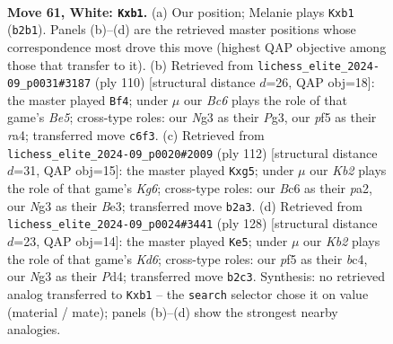 \documentclass[11pt]{article}
\begin{document}
\clearpage

\begin{figure}[p]\centering
\begin{subfigure}{0.46\textwidth}\centering
\resizebox{\linewidth}{!}{%
\newchessgame
\chessboard[
  setfen={8/k7/2B1r3/2R2p2/1P6/6N1/1K4P1/1b6 w - - 0 61},
  showmover=false,
  pgfstyle=straightmove, color=movearrow, markmove={b2-b1}
]}
\caption{}
\end{subfigure}\hfill
\begin{subfigure}{0.46\textwidth}\centering
\resizebox{\linewidth}{!}{%
\newchessgame
\chessboard[
  setfen={8/8/4k3/4B1Rp/r1P3b1/3K2P1/8/8 w - - 1 56},
  showmover=false,
  pgfstyle=straightmove, color=movearrow, markmove={e5-f4}
]}
\caption{}
\end{subfigure}
\\[4pt]
\begin{subfigure}{0.46\textwidth}\centering
\resizebox{\linewidth}{!}{%
\newchessgame
\chessboard[
  setfen={8/1k6/6K1/6p1/6P1/R3B3/pr3P2/8 w - - 11 57},
  showmover=false,
  pgfstyle=straightmove, color=movearrow, markmove={g6-g5}
]}
\caption{}
\end{subfigure}\hfill
\begin{subfigure}{0.46\textwidth}\centering
\resizebox{\linewidth}{!}{%
\newchessgame
\chessboard[
  setfen={8/8/3KR3/3p2B1/2bP1P2/5k2/8/6r1 w - - 3 65},
  showmover=false,
  pgfstyle=straightmove, color=movearrow, markmove={d6-e5}
]}
\caption{}
\end{subfigure}
\caption{\textbf{Move 61, White: \texttt{Kxb1}.} (a) Our position; Melanie plays \texttt{Kxb1} (\texttt{b2b1}). Panels (b)--(d) are the retrieved master positions whose correspondence most drove this move (highest QAP objective among those that transfer to it). (b) Retrieved from \texttt{lichess\_elite\_2024-09\_p0031\#3187} (ply 110) [structural distance $d$=26, QAP obj=18]: the master played \texttt{Bf4}; under $\mu$ our \emph{Bc6} plays the role of that game's \emph{Be5}; cross-type roles: our \emph{N}g3 as their \emph{P}g3, our \emph{p}f5 as their \emph{r}a4; transferred move \texttt{c6f3}. (c) Retrieved from \texttt{lichess\_elite\_2024-09\_p0020\#2009} (ply 112) [structural distance $d$=31, QAP obj=15]: the master played \texttt{Kxg5}; under $\mu$ our \emph{Kb2} plays the role of that game's \emph{Kg6}; cross-type roles: our \emph{B}c6 as their \emph{p}a2, our \emph{N}g3 as their \emph{B}e3; transferred move \texttt{b2a3}. (d) Retrieved from \texttt{lichess\_elite\_2024-09\_p0024\#3441} (ply 128) [structural distance $d$=23, QAP obj=14]: the master played \texttt{Ke5}; under $\mu$ our \emph{Kb2} plays the role of that game's \emph{Kd6}; cross-type roles: our \emph{p}f5 as their \emph{b}c4, our \emph{N}g3 as their \emph{P}d4; transferred move \texttt{b2c3}. Synthesis: no retrieved analog transferred to \texttt{Kxb1} -- the \texttt{search} selector chose it on value (material / mate); panels (b)--(d) show the strongest nearby analogies.}
\label{fig:thought-m120}
\end{figure}
\end{document}
